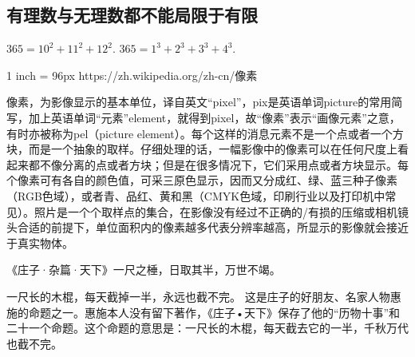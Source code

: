 \documentclass[main.tex]{subfiles}
\begin{document}
\subsection{有理数与无理数都不能局限于有限}

$365=10^2+11^2+12^2$.
$365=1^3+2^3+3^3+4^3$.


1 inch = 96px
https://zh.wikipedia.org/zh-cn/像素

像素，为影像显示的基本单位，译自英文“pixel”，pix是英语单词picture的常用简写，加上英语单词“元素”element，就得到pixel，故“像素”表示“画像元素”之意，有时亦被称为pel（picture element）。每个这样的消息元素不是一个点或者一个方块，而是一个抽象的取样。仔细处理的话，一幅影像中的像素可以在任何尺度上看起来都不像分离的点或者方块；但是在很多情况下，它们采用点或者方块显示。每个像素可有各自的颜色值，可采三原色显示，因而又分成红、绿、蓝三种子像素（RGB色域），或者青、品红、黄和黑（CMYK色域，印刷行业以及打印机中常见）。照片是一个个取样点的集合，在影像没有经过不正确的/有损的压缩或相机镜头合适的前提下，单位面积内的像素越多代表分辨率越高，所显示的影像就会接近于真实物体。


《庄子·杂篇·天下》一尺之棰，日取其半，万世不竭。

一尺长的木棍，每天截掉一半，永远也截不完。
这是庄子的好朋友、名家人物惠施的命题之一。惠施本人没有留下著作，《庄子•天下》保存了他的“历物十事”和二十一个命题。这个命题的意思是：一尺长的木棍，每天截去它的一半，千秋万代也截不完。
\end{document}
